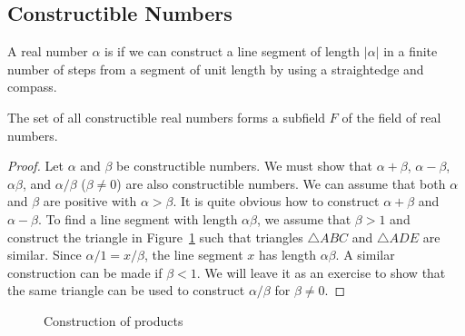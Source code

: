  

\subsection*{Constructible Numbers}
 

A real number $\alpha$ is  if we can construct a line segment of length $| \alpha |$ in a
finite number of steps from a segment of unit length by using a
straightedge and compass.  
 

\begin{theorem}\label{fields:construct_num_ther}
The set of all constructible real numbers forms a subfield $F$ of the
field of real numbers. 
\end{theorem}
 
 
\begin{proof}
Let $\alpha$ and $\beta$ be constructible numbers.  We must show that
$\alpha + \beta$, $\alpha - \beta$, $\alpha \beta$, and $\alpha /
\beta$ ($\beta \neq 0$) are also constructible numbers. We can assume
that both $\alpha$ and $\beta$ are positive with $\alpha > \beta$. It
is quite obvious how to construct $\alpha + \beta$ and $\alpha -
\beta$. To find a line segment with length $\alpha \beta$, we assume
that $\beta > 1$ and construct the triangle in Figure~\ref{Multiply}
such that triangles $\triangle ABC$ and $\triangle ADE$ are similar.
Since $\alpha / 1 = x / \beta$, the line segment $x$ has length
$\alpha \beta$.  A similar construction can be made if $\beta < 1$. We
will leave it as an exercise to show that the same triangle can be
used to construct $\alpha / \beta$ for $\beta \neq 0$.  
\end{proof}

\begin{figure}[htb]
\begin{center}

\end{center}
\caption{Construction of products}
\label{Multiply}
\end{figure}


